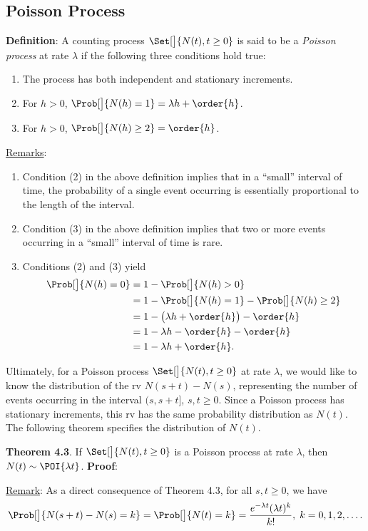 \subsection*{Poisson Process}
\begin{Regular}
    \textbf{Definition}: A counting process $ \Set[\big]{N(t),t\ge 0} $ is said to be a \emph{Poisson process} at rate $ \lambda $
    if the following three conditions hold true:
    \begin{enumerate}[(1)]
        \item The process has both independent and stationary increments.
        \item For $ h>0 $, $ \Prob[\big]{N(h)=1}=\lambda h+\order{h} $.
        \item For $ h>0 $, $ \Prob[\big]{N(h)\ge 2}=\order{h} $.
    \end{enumerate}
    \tcblower{}
    \underline{Remarks}:
    \begin{enumerate}[(1)]
        \item Condition (2) in the above definition implies that in a ``small'' interval of time, the probability of a single
              event occurring is essentially proportional to the length of the interval.
        \item Condition (3) in the above definition implies that two or more events occurring in a ``small'' interval of time is rare.
        \item Conditions (2) and (3) yield
              \begin{align*}
                  \Prob[\big]{N(h)=0}
                   & =1-\Prob[\big]{N(h)>0}                        \\
                   & =1-\Prob[\big]{N(h)=1}-\Prob[\big]{N(h)\ge 2} \\
                   & =1-\bigl(\lambda h+\order{h}\bigr)-\order{h}  \\
                   & =1-\lambda h-\order{h}-\order{h}              \\
                   & =1-\lambda h+\order{h}.
              \end{align*}
    \end{enumerate}
\end{Regular}
Ultimately, for a Poisson process $ \Set[\big]{N(t),t\ge 0} $ at rate $ \lambda $, we would like to know the distribution of
the rv $ N(s+t)-N(s) $, representing the number of events occurring in the interval $ (s,s+t] $, $ s,t\ge 0 $. Since a Poisson
process has stationary increments, this rv has the same probability distribution as $ N(t) $. The following
theorem specifies the distribution of $ N(t) $.
\begin{Result}
    \textbf{Theorem 4.3}. If $ \Set[\big]{N(t),t\ge 0} $ is a Poisson process at rate $ \lambda $, then $ N(t) \sim \POI{\lambda t} $.
    \tcblower{}
    \textbf{Proof}:
\end{Result}
\underline{Remark}: As a direct consequence of Theorem 4.3, for all $ s,t\ge 0 $, we have
\[ \Prob[\big]{N(s+t)-N(s)=k}=\Prob[\big]{N(t)=k}=\frac{e^{-\lambda t}(\lambda t)^k}{k!},\; k=0,1,2,\ldots. \]

